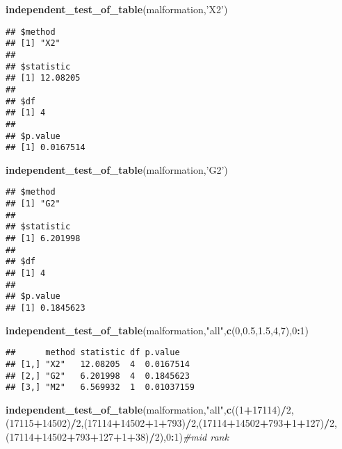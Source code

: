 \documentclass[12pt,hyperref,]{ctexart}
\newenvironment{Shaded}{\begin{snugshade}}{\end{snugshade}}
\newcommand{\CommentTok}[1]{\textcolor[rgb]{0.56,0.35,0.01}{\textit{#1}}}
\newcommand{\DecValTok}[1]{\textcolor[rgb]{0.00,0.00,0.81}{#1}}
\newcommand{\FloatTok}[1]{\textcolor[rgb]{0.00,0.00,0.81}{#1}}
\newcommand{\KeywordTok}[1]{\textcolor[rgb]{0.13,0.29,0.53}{\textbf{#1}}}
\newcommand{\NormalTok}[1]{#1}
\newcommand{\OperatorTok}[1]{\textcolor[rgb]{0.81,0.36,0.00}{\textbf{#1}}}
\newcommand{\StringTok}[1]{\textcolor[rgb]{0.31,0.60,0.02}{#1}}
\begin{document}
\begin{Shaded}
\begin{Highlighting}[]
\KeywordTok{independent_test_of_table}\NormalTok{(malformation,}\StringTok{'X2'}\NormalTok{)}
\end{Highlighting}
\end{Shaded}

\begin{verbatim}
## $method
## [1] "X2"
## 
## $statistic
## [1] 12.08205
## 
## $df
## [1] 4
## 
## $p.value
## [1] 0.0167514
\end{verbatim}

\begin{Shaded}
\begin{Highlighting}[]
\KeywordTok{independent_test_of_table}\NormalTok{(malformation,}\StringTok{'G2'}\NormalTok{)}
\end{Highlighting}
\end{Shaded}

\begin{verbatim}
## $method
## [1] "G2"
## 
## $statistic
## [1] 6.201998
## 
## $df
## [1] 4
## 
## $p.value
## [1] 0.1845623
\end{verbatim}

\begin{Shaded}
\begin{Highlighting}[]
\KeywordTok{independent_test_of_table}\NormalTok{(malformation,}\StringTok{"all"}\NormalTok{,}\KeywordTok{c}\NormalTok{(}\DecValTok{0}\NormalTok{,}\FloatTok{0.5}\NormalTok{,}\FloatTok{1.5}\NormalTok{,}\DecValTok{4}\NormalTok{,}\DecValTok{7}\NormalTok{),}\DecValTok{0}\OperatorTok{:}\DecValTok{1}\NormalTok{)}
\end{Highlighting}
\end{Shaded}

\begin{verbatim}
##      method statistic df p.value   
## [1,] "X2"   12.08205  4  0.0167514 
## [2,] "G2"   6.201998  4  0.1845623 
## [3,] "M2"   6.569932  1  0.01037159
\end{verbatim}

\begin{Shaded}
\begin{Highlighting}[]
\KeywordTok{independent_test_of_table}\NormalTok{(malformation,}\StringTok{"all"}\NormalTok{,}\KeywordTok{c}\NormalTok{((}\DecValTok{1}\OperatorTok{+}\DecValTok{17114}\NormalTok{)}\OperatorTok{/}\DecValTok{2}\NormalTok{,(}\DecValTok{17115}\OperatorTok{+}\DecValTok{14502}\NormalTok{)}\OperatorTok{/}\DecValTok{2}\NormalTok{,(}\DecValTok{17114}\OperatorTok{+}\DecValTok{14502}\OperatorTok{+}\DecValTok{1}\OperatorTok{+}\DecValTok{793}\NormalTok{)}\OperatorTok{/}\DecValTok{2}\NormalTok{,(}\DecValTok{17114}\OperatorTok{+}\DecValTok{14502}\OperatorTok{+}\DecValTok{793}\OperatorTok{+}\DecValTok{1}\OperatorTok{+}\DecValTok{127}\NormalTok{)}\OperatorTok{/}\DecValTok{2}\NormalTok{,(}\DecValTok{17114}\OperatorTok{+}\DecValTok{14502}\OperatorTok{+}\DecValTok{793}\OperatorTok{+}\DecValTok{127}\OperatorTok{+}\DecValTok{1}\OperatorTok{+}\DecValTok{38}\NormalTok{)}\OperatorTok{/}\DecValTok{2}\NormalTok{),}\DecValTok{0}\OperatorTok{:}\DecValTok{1}\NormalTok{)}\CommentTok{#mid rank}
\end{Highlighting}
\end{Shaded}
\end{document}
